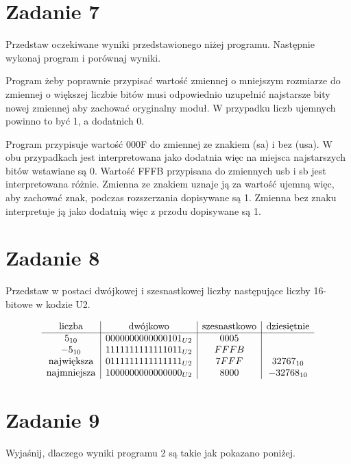 \documentclass[a4paper, 11pt]{article}
\begin{document}

\section{Zadanie 7}\label{sec:zadanie7_} %
Przedstaw oczekiwane wyniki przedstawionego niżej programu. Następnie wykonaj program i porównaj wyniki.

Program żeby poprawnie przypisać wartość zmiennej o mniejszym rozmiarze do zmiennej o większej liczbie bitów musi odpowiednio uzupełnić najstarsze bity nowej zmiennej aby zachować oryginalny moduł. W przypadku liczb ujemnych powinno to być 1, a dodatnich 0.

Program przypisuje wartość 000F do zmiennej ze znakiem (sa) i bez (usa).
W obu przypadkach jest interpretowana jako dodatnia więc na miejsca najstarszych bitów wstawiane są 0.
Wartość FFFB przypisana do zmiennych usb i sb jest interpretowana różnie.
Zmienna ze znakiem uznaje ją za wartość ujemną więc, aby zachować znak, podczas rozszerzania dopisywane są 1. Zmienna bez znaku interpretuje ją jako dodatnią więc z przodu dopisywane są 1.



\section{Zadanie 8}\label{sec:zadanie8_} %
Przedstaw w postaci dwójkowej i szesnastkowej liczby następujące liczby 16-bitowe w kodzie U2.

\[
	\begin{array}{c | c | c | c}
		\text{liczba}      & \text{dwójkowo}       & \text{szesnastkowo} & \text{dziesiętnie} \\
		\hline
		5_{10}             & 0000000000000101_{U2} & 0005                &                    \\
		-5_{10}            & 1111111111111011_{U2} & FFFB                                     \\
		\text{największa}  & 0111111111111111_{U2} & 7FFF                & 32767_{10}         \\
		\text{najmniejsza} & 1000000000000000_{U2} & 8000                & -32768_{10}
	\end{array}
\]


\section{Zadanie 9}\label{sec:zadanie_} %
Wyjaśnij, dlaczego wyniki programu 2 są takie jak pokazano poniżej.
\end{document}
